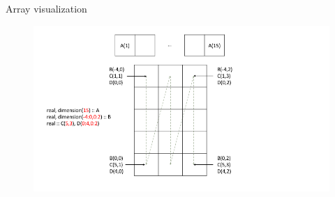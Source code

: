\documentclass[11pt]{beamer}
\begin{document}
\begin{frame}{Array visualization}


\begin{figure}[t]
\centering
\includegraphics[scale=.4]{../../shared/array_vis2.png}
\end{figure}
  

\end{frame}


\end{document}
